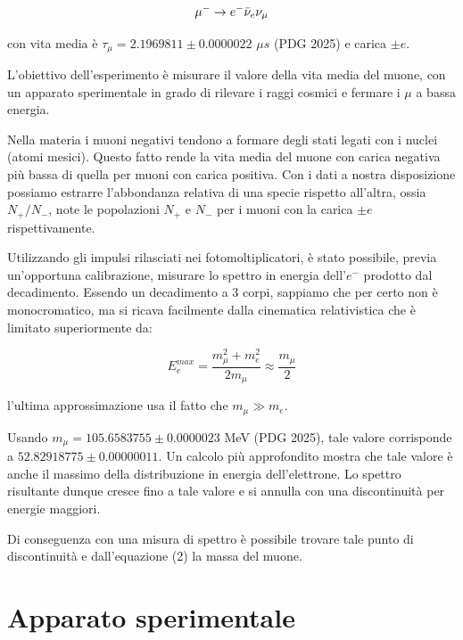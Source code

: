 \documentclass[10pt,a4paper]{article}
\begin{document}
\begin{equation}
    \ce{$\mu^{-}\rightarrow e^{-}\bar \nu_e \nu_{\mu}$}
\end{equation}


con vita media è $\tau_{\mu} = 2.1969811 \pm 0.0000022 $ $\mu s$ (PDG 2025) e carica $\pm e$.

L'obiettivo dell'esperimento è misurare il valore della vita media del muone, con un apparato sperimentale in grado di rilevare i raggi cosmici e fermare i $\mu$ a bassa energia. 

Nella materia i muoni negativi tendono a formare degli stati legati con i nuclei (atomi mesici). Questo fatto rende la vita media del muone con carica negativa più bassa di quella per muoni con carica positiva. Con i dati a nostra disposizione possiamo estrarre l'abbondanza relativa di una specie rispetto all'altra, ossia $N_+/N_-$, note le popolazioni $N_+$ e $N_-$ per i muoni con la carica $\pm e$ rispettivamente.

Utilizzando gli impulsi rilasciati nei fotomoltiplicatori, è stato possibile, previa un'opportuna calibrazione, misurare lo spettro in energia dell'$e^{-}$ prodotto dal decadimento. Essendo un decadimento a 3 corpi, sappiamo che per certo non è monocromatico, ma si ricava facilmente dalla cinematica relativistica che è limitato superiormente da:

\begin{equation}
    E_e^{max} = \frac{m_{\mu}^2+m_{e}^2}{2m_{\mu}}\approx\frac{m_{\mu}}{2}
\end{equation}

l'ultima approssimazione usa il fatto che $m_{\mu}\gg m_e$.

Usando $m_\mu = 105.6583755 \pm 0.0000023$ MeV (PDG 2025), tale valore corrisponde a $52.82918775 \pm 0.00000011$. Un calcolo più approfondito mostra che tale valore è anche il massimo della distribuzione in energia dell'elettrone. Lo spettro risultante dunque cresce fino a tale valore e si annulla con una discontinuità per energie maggiori. 

Di conseguenza con una misura di spettro è possibile trovare tale punto di discontinuità e dall'equazione (2) la massa del muone.


\section{Apparato sperimentale}
\end{document}
